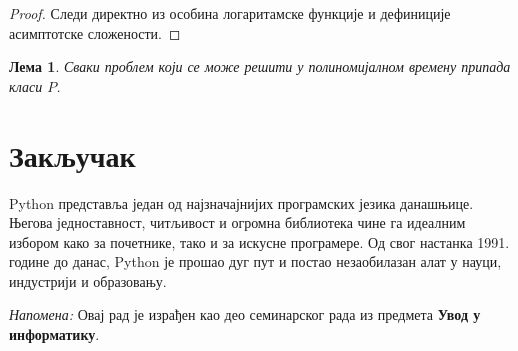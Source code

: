 \documentclass[12pt,a4paper]{article}
\newtheorem{lema}{Лема}[section]
\begin{document}
\begin{proof}
Следи директно из особина логаритамске функције и дефиниције
асимптотске сложености.
\end{proof}

\begin{lema}
Сваки проблем који се може решити у полиномијалном времену припада
класи $P$.
\end{lema}

\section{Закључак}

Python представља један од најзначајнијих програмских језика данашњице.
Његова једноставност, читљивост и огромна библиотека чине га идеалним
избором како за почетнике, тако и за искусне програмере. Од свог
настанка 1991. године до данас, Python је прошао дуг пут и постао
незаобилазан алат у науци, индустрији и образовању.

\vspace{1cm}
\noindent\textit{\textcolor{crvena}{Напомена:}} Овај рад је израђен као
део семинарског рада из предмета \textbf{Увод у информатику}.
\end{document}
